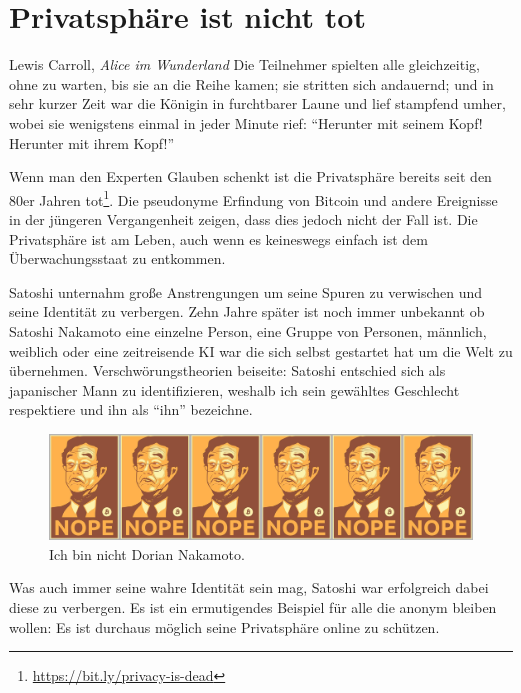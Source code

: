 \chapter{Privatsphäre ist nicht tot}
\label{les:19}

\begin{chapquote}{Lewis Carroll, \textit{Alice im Wunderland}}
Die Teilnehmer spielten alle gleichzeitig, ohne zu warten, bis sie an die Reihe
kamen; sie stritten sich andauernd; und in sehr kurzer Zeit war die Königin in
furchtbarer Laune und lief stampfend umher, wobei sie wenigstens einmal in jeder
Minute rief: \enquote{Herunter mit seinem Kopf! Herunter mit ihrem Kopf!}
\end{chapquote}

Wenn man den Experten Glauben schenkt ist die Privatsphäre bereits seit den 80er
Jahren tot\footnote{\url{https://bit.ly/privacy-is-dead}}. Die pseudonyme
Erfindung von Bitcoin und andere Ereignisse in der jüngeren Vergangenheit zeigen,
dass dies jedoch nicht der Fall ist. Die Privatsphäre ist am Leben, auch wenn es
keineswegs einfach ist dem Überwachungsstaat zu entkommen.

Satoshi unternahm große Anstrengungen um seine Spuren zu verwischen und seine
Identität zu verbergen. Zehn Jahre später ist noch immer unbekannt ob Satoshi
Nakamoto eine einzelne Person, eine Gruppe von Personen, männlich, weiblich oder
eine zeitreisende KI war die sich selbst gestartet hat um die Welt zu
übernehmen. Verschwörungstheorien beiseite: Satoshi entschied sich als
japanischer Mann zu identifizieren, weshalb ich sein gewähltes Geschlecht
respektiere und ihn als \enquote{ihn} bezeichne.

\begin{figure}
  \includegraphics{assets/images/nope.png}
  \caption{Ich bin nicht Dorian Nakamoto.}
  \label{fig:nope}
\end{figure}

Was auch immer seine wahre Identität sein mag, Satoshi war erfolgreich dabei
diese zu verbergen. Es ist ein ermutigendes Beispiel für alle die anonym bleiben
wollen: Es ist durchaus möglich seine Privatsphäre online zu schützen.

